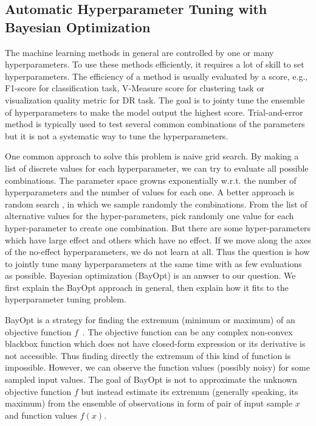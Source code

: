 \subsection{Automatic Hyperparameter Tuning with Bayesian Optimization}

The machine learning methods in general are controlled by one or many hyperparameters.
To use these methods efficiently, it requires a lot of skill to set hyperparameters.
The efficiency of a method is usually evaluated by a score,
e.g., F1-score for classification task, V-Measure score for clustering task or
visualization quality metric for DR task.
The goal is to jointy tune the ensemble of hyperparameters to
make the model output the highest score.
Trial-and-error method is typically used to test several common combinations of the parameters
but it is not a systematic way to tune the hyperparameters.

One common approach to solve this problem is naive grid search.
By making a list of discrete values for each hyperparameter,
we can try to evaluate all possible combinations.
The parameter space growns exponentially w.r.t. the number of hyperparameters
and the number of values for each one.
A better approach is random search \cite{bergstra2011algorithms}, in which we sample randomly the combinations.
From the list of alternative values for the hyper-parameters,
pick randomly one value for each hyper-parameter to create one combination.
But there are some hyper-parameters which have large effect and others which have no effect.
If we move along the axes of the no-effect hyperparameters, we do not learn at all.
Thus the question is how to jointly tune many hyperparameters at the same time
with as few evaluations as possible.
Bayesian optimization (BayOpt) is an anwser to our question.
We first explain the BayOpt approach in general, then explain how it fits to the hyperparameter tuning problem.

BayOpt is a strategy for finding the extremum (minimum or maximum) of an objective function $f$~\cite{mockus1975on}.
The objective function can be any complex non-convex blackbox function which does not have closed-form expression or its derivative is not accessible.
Thus finding directly the extremum of this kind of function is impossible.
However, we can observe the function values (possibly noisy) for some sampled input values.
The goal of BayOpt is not to approximate the unknown objective function $f$ but instead
estimate its extremum (generally speaking, its maximum) from the ensemble of observations
in form of pair of input sample $x$ and function values $f(x)$.

